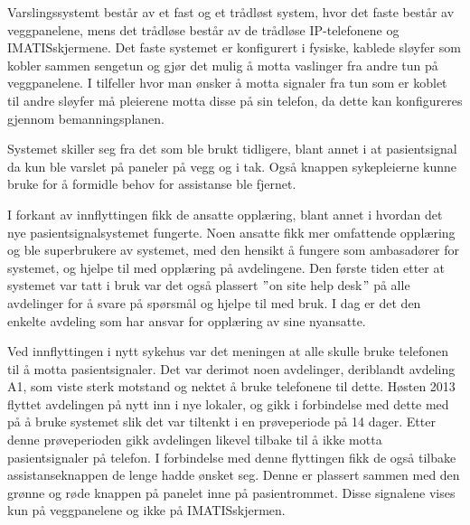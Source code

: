 \noindent
Varslingssystemt består av et fast og et trådløst system, hvor det faste består av veggpanelene, mens det trådløse består av de trådløse IP-telefonene og IMATISskjermene. Det faste systemet er konfigurert i fysiske, kablede sløyfer som kobler sammen sengetun og gjør det mulig å motta vaslinger fra andre tun på veggpanelene. I tilfeller hvor man ønsker å motta signaler fra tun som er koblet til andre sløyfer må pleierene motta disse på sin telefon, da dette kan konfigureres gjennom bemanningsplanen.

\noindent
Systemet skiller seg fra det som ble brukt tidligere, blant annet i at pasientsignal da kun ble varslet på paneler på vegg og i tak. Også knappen sykepleierne kunne bruke for å formidle behov for assistanse ble fjernet.


\noindent
I forkant av innflyttingen fikk de ansatte opplæring, blant annet i hvordan det nye pasientsignalsystemet fungerte. Noen ansatte fikk mer omfattende opplæring og ble superbrukere av systemet, med den hensikt å fungere som ambasadører for systemet, og hjelpe til med opplæring på avdelingene. Den første tiden etter at systemet var tatt i bruk var det også plassert $"$on site help desk$"$ på alle avdelinger for å svare på spørsmål og hjelpe til med bruk. I dag er det den enkelte avdeling som har ansvar for opplæring av sine nyansatte. 

\noindent
Ved innflyttingen i nytt sykehus var det meningen at alle skulle bruke telefonen til å motta pasientsignaler. Det var derimot noen avdelinger, deriblandt avdeling A1, som viste sterk motstand og nektet å bruke telefonene til dette.
Høsten 2013 flyttet avdelingen på nytt inn i nye lokaler, og gikk i forbindelse med dette med på å bruke systemet slik det var tiltenkt i en prøveperiode på 14 dager. Etter denne prøveperioden gikk avdelingen likevel tilbake til å ikke motta pasientsignaler på telefon. 
I forbindelse med denne flyttingen fikk de også tilbake assistanseknappen de lenge hadde ønsket seg. Denne er plassert sammen med den grønne og røde knappen på panelet inne på pasientrommet. Disse signalene vises kun på veggpanelene og ikke på IMATISskjermen.
